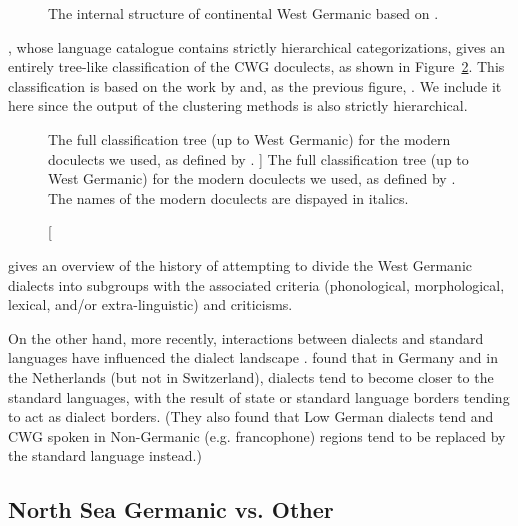 \documentclass[a4paper]{article}
\begin{document}
\begin{figure}[b]
\centering

\caption{
The internal structure of continental West Germanic
based on \citet[p. 8]{harbert2007germanic}.
}
\label{fig:cwg_harbert}
\end{figure}


\citet{hammarstroem2018glottolog}, whose language catalogue
contains strictly hierarchical categorizations, %
gives an entirely tree-like classification of the CWG doculects,
as shown in Figure~\ref{fig:glottolog}.
This classification is based on the work by \citet{stiles2013pan-west}
and, as the previous figure, \citet{harbert2007germanic}.
We include it here since the output of the clustering methods
is also strictly hierarchical.

\begin{figure}[h]
\begin{adjustwidth}{-3cm}{-3cm}
\centering
\scalebox{0.8}{

}
\end{adjustwidth}
% 
\caption
[
The full classification tree (up to West Germanic) for the modern doculects we used,
as defined by \citet{hammarstroem2018glottolog}.
]
{
The full classification tree (up to West Germanic) for the modern doculects we used,
as defined by \citet{hammarstroem2018glottolog}.
The names of the modern doculects are dispayed in italics.
}
\label{fig:glottolog}
\end{figure}

\citet[pp. 72-80]{nielsen1989germanic} gives an overview of the history of attempting to divide the West Germanic dialects into subgroups with the associated criteria (phonological, morphological, lexical, and/or extra-linguistic) and criticisms.

On the other hand, more recently, %
interactions between dialects and standard languages
have influenced the dialect landscape
\citep{coetsem1992interaction}.
\citet{kremer1990einfuehrung} found that in Germany and in the Netherlands
(but not in Switzerland), dialects tend to become closer to the standard languages,
with the result of state or standard language borders tending to act as dialect borders.
(They also found that Low German dialects tend and CWG spoken in Non-Germanic (e.g. francophone) regions tend to be replaced by the standard language instead.)

\subsection{North Sea Germanic vs. Other}
\end{document}

